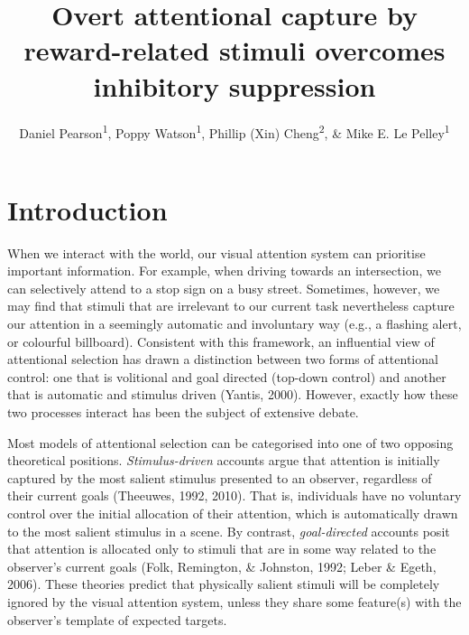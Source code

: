 \documentclass[man, a4paper, noextraspace, 11pt,floatsintext]{apa6}
\title{Overt attentional capture by reward-related stimuli overcomes inhibitory
suppression}
\author{Daniel Pearson\textsuperscript{1}, Poppy Watson\textsuperscript{1},
Phillip (Xin) Cheng\textsuperscript{2}, \& Mike E. Le
Pelley\textsuperscript{1}}
\date{}
\affiliation{
\vspace{0.5cm}
\textsuperscript{1} School of Psychology, UNSW Sydney\\\textsuperscript{2} Department of Cognitive Science, Macquarie University}
\theoremstyle{definition}
\theoremstyle{definition}
\theoremstyle{definition}
\theoremstyle{remark}
\begin{document}
\maketitle

\section{Introduction}\label{introduction}

When we interact with the world, our visual attention system can
prioritise important information. For example, when driving towards an
intersection, we can selectively attend to a stop sign on a busy street.
Sometimes, however, we may find that stimuli that are irrelevant to our
current task nevertheless capture our attention in a seemingly automatic
and involuntary way (e.g., a flashing alert, or colourful billboard).
Consistent with this framework, an influential view of attentional
selection has drawn a distinction between two forms of attentional
control: one that is volitional and goal directed (top-down control) and
another that is automatic and stimulus driven (Yantis, 2000). However,
exactly how these two processes interact has been the subject of
extensive debate.

Most models of attentional selection can be categorised into one of two
opposing theoretical positions. \emph{Stimulus-driven} accounts argue
that attention is initially captured by the most salient stimulus
presented to an observer, regardless of their current goals (Theeuwes,
1992, 2010). That is, individuals have no voluntary control over the
initial allocation of their attention, which is automatically drawn to
the most salient stimulus in a scene. By contrast, \emph{goal-directed}
accounts posit that attention is allocated only to stimuli that are in
some way related to the observer's current goals (Folk, Remington, \&
Johnston, 1992; Leber \& Egeth, 2006). These theories predict that
physically salient stimuli will be completely ignored by the visual
attention system, unless they share some feature(s) with the observer's
template of expected targets.
\end{document}

